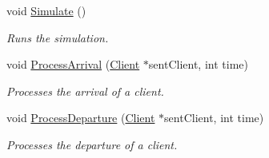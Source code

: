 \begin{DoxyCompactItemize}
void \hyperlink{class_simulation1_a_a415550ac4cfb5782b43c565f62da3df3}{Simulate} ()
\begin{DoxyCompactList}\small\item\em Runs the simulation. \end{DoxyCompactList}\item 
void \hyperlink{class_simulation1_a_aac07aaeea13487e814394ff391ace7de}{Process\+Arrival} (\hyperlink{class_client}{Client} $\ast$sent\+Client, int time)
\begin{DoxyCompactList}\small\item\em Processes the arrival of a client. \end{DoxyCompactList}\item 
void \hyperlink{class_simulation1_a_aa6a20ed7614c1a2bd31083870a28c590}{Process\+Departure} (\hyperlink{class_client}{Client} $\ast$sent\+Client, int time)
\begin{DoxyCompactList}\small\item\em Processes the departure of a client. \end{DoxyCompactList}\end{DoxyCompactItemize}

